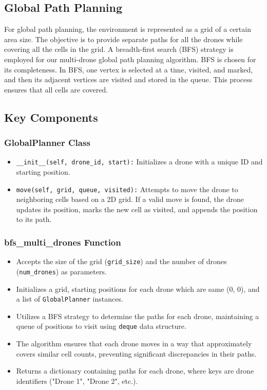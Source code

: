 
\subsection{Global Path Planning}

For global path planning, the environment is represented as a grid of a certain area size. The objective is to provide separate paths for all the drones while covering all the cells in the grid. A breadth-first search (BFS) strategy is employed for our multi-drone global path planning algorithm. BFS is chosen for its completeness. In BFS, one vertex is selected at a time, visited, and marked, and then its adjacent vertices are visited and stored in the queue. This process ensures that all cells are covered.

\subsection{Key Components}

\subsubsection{GlobalPlanner Class}

\begin{itemize}
    \item \texttt{\_\_init\_\_(self, drone\_id, start):} Initializes a drone with a unique ID and starting position.
    \item \texttt{move(self, grid, queue, visited):} Attempts to move the drone to neighboring cells based on a 2D grid. If a valid move is found, the drone updates its position, marks the new cell as visited, and appends the position to its path.
\end{itemize}

\subsubsection{bfs\_multi\_drones Function}

\begin{itemize}
    \item Accepts the size of the grid (\texttt{grid\_size}) and the number of drones (\texttt{num\_drones}) as parameters.
    \item Initializes a grid, starting positions for each drone which are same (0, 0), and a list of \texttt{GlobalPlanner} instances.
    \item Utilizes a BFS strategy to determine the paths for each drone, maintaining a queue of positions to visit using \texttt{deque} data structure.
    \item The algorithm ensures that each drone moves in a way that approximately covers similar cell counts, preventing significant discrepancies in their paths.
    \item Returns a dictionary containing paths for each drone, where keys are drone identifiers ("Drone 1", "Drone 2", etc.).
\end{itemize}

